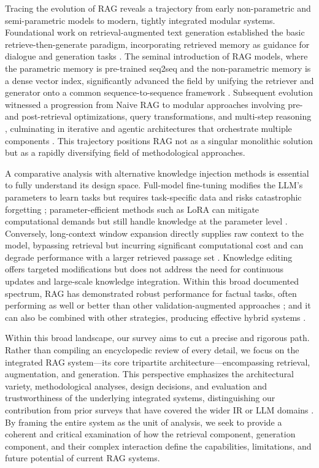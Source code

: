 \documentclass[11pt,a4paper]{article}
\begin{document}
Tracing the evolution of RAG reveals a trajectory from early non-parametric and semi-parametric models to modern, tightly integrated modular systems. Foundational work on retrieval-augmented text generation established the basic retrieve-then-generate paradigm, incorporating retrieved memory as guidance for dialogue and generation tasks \cite{arxiv:1809.05296v5,arxiv:2202.01110v2}. The seminal introduction of RAG models, where the parametric memory is pre-trained seq2seq and the non-parametric memory is a dense vector index, significantly advanced the field by unifying the retriever and generator onto a common sequence-to-sequence framework \cite{arxiv:2005.11401v4}. Subsequent evolution witnessed a progression from Naive RAG to modular approaches involving pre- and post-retrieval optimizations, query transformations, and multi-step reasoning \cite{arxiv:2312.10997v5,arxiv:2305.06983v2}, culminating in iterative and agentic architectures that orchestrate multiple components \cite{arxiv:2501.09136v4,arxiv:2411.19443v1}. This trajectory positions RAG not as a singular monolithic solution but as a rapidly diversifying field of methodological approaches.

A comparative analysis with alternative knowledge injection methods is essential to fully understand its design space. Full-model fine-tuning modifies the LLM's parameters to learn tasks but requires task-specific data and risks catastrophic forgetting \cite{arxiv:2402.01364v2}; parameter-efficient methods such as LoRA can mitigate computational demands but still handle knowledge at the parameter level \cite{arxiv:2603.04647v1}. Conversely, long-context window expansion directly supplies raw context to the model, bypassing retrieval but incurring significant computational cost and can degrade performance with a larger retrieved passage set \cite{arxiv:2410.05983v1,arxiv:2407.02485v1}. Knowledge editing offers targeted modifications but does not address the need for continuous updates and large-scale knowledge integration. Within this broad documented spectrum, RAG has demonstrated robust performance for factual tasks, often performing as well or better than other validation-augmented approaches \cite{arxiv:2212.10511v4}; and it can also be combined with other strategies, producing effective hybrid systems \cite{arxiv:2501.15915v1,arxiv:2410.05983v1}.

Within this broad landscape, our survey aims to cut a precise and rigorous path. Rather than compiling an encyclopedic review of every detail, we focus on the integrated RAG system---its core tripartite architecture---encompassing retrieval, augmentation, and generation. This perspective emphasizes the architectural variety, methodological analyses, design decisions, and evaluation and trustworthiness of the underlying integrated systems, distinguishing our contribution from prior surveys that have covered the wider IR or LLM domains \cite{arxiv:2308.07107v3,arxiv:2506.00054v1}. By framing the entire system as the unit of analysis, we seek to provide a coherent and critical examination of how the retrieval component, generation component, and their complex interaction define the capabilities, limitations, and future potential of current RAG systems.
\end{document}
